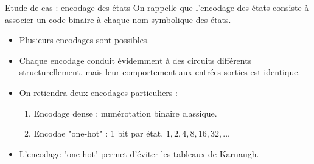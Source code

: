 \documentclass[xcolor=table]{beamer}
\begin{document}
\begin{frame}{Etude de cas : encodage des états}
On rappelle que l'encodage des états consiste à associer un code binaire à chaque nom symbolique des états.
  \begin{itemize}
    \item Plusieurs encodages sont possibles.
    \item Chaque encodage conduit évidemment à des circuits différents structurellement, mais leur comportement
    aux entrées-sorties est identique.
    \item On retiendra deux encodages particuliers :
    \begin{enumerate}
      \item Encodage dense : numérotation binaire classique.
      \item Encodae "one-hot" : 1 bit par état. $1,2,4,8,16,32,...$
    \end{enumerate}
    \item L'encodage "one-hot" permet d'éviter les tableaux de Karnaugh.
  \end{itemize}
\end{frame}
\end{document}
